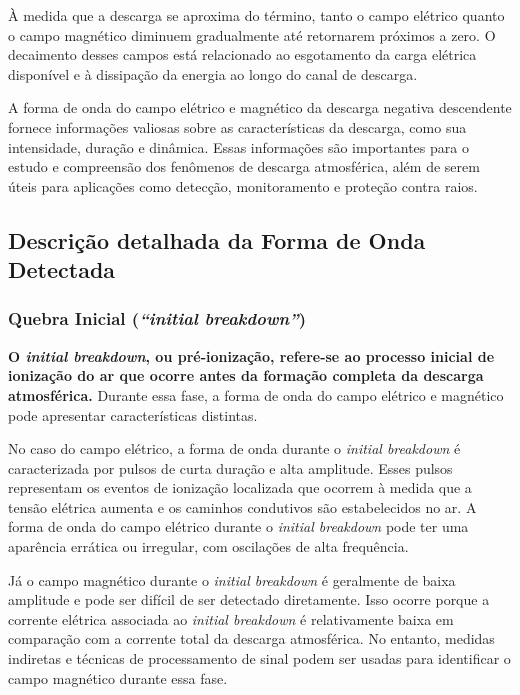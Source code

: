 \documentclass[a4paper, 12pt, onecolumn,singlespacing]{article}
\begin{document}
	À medida que a descarga se aproxima do término, tanto o campo elétrico quanto o campo magnético diminuem gradualmente até retornarem próximos a zero. O decaimento desses campos está relacionado ao esgotamento da carga elétrica disponível e à dissipação da energia ao longo do canal de descarga.
	
	A forma de onda do campo elétrico e magnético da descarga negativa descendente fornece informações valiosas sobre as características da descarga, como sua intensidade, duração e dinâmica. Essas informações são importantes para o estudo e compreensão dos fenômenos de descarga atmosférica, além de serem úteis para aplicações como detecção, monitoramento e proteção contra raios.
	
	\subsection{Descrição detalhada da Forma de Onda Detectada}
	
	\subsubsection{ Quebra Inicial (\textit{``initial breakdown''})}
	
		\textbf{O \textit{initial breakdown}\cite{RAKOV_UHMAN}, ou pré-ionização, refere-se ao processo inicial de ionização do ar que ocorre antes da formação completa da descarga atmosférica.} Durante essa fase, a forma de onda do campo elétrico e magnético pode apresentar características distintas.
		
		No caso do campo elétrico, a forma de onda durante o \textit{initial breakdown} é caracterizada por pulsos de curta duração e alta amplitude. Esses pulsos representam os eventos de ionização localizada que ocorrem à medida que a tensão elétrica aumenta e os caminhos condutivos são estabelecidos no ar. A forma de onda do campo elétrico durante o \textit{initial breakdown} pode ter uma aparência errática ou irregular, com oscilações de alta frequência.
		
		Já o campo magnético durante o \textit{initial breakdown} é geralmente de baixa amplitude e pode ser difícil de ser detectado diretamente. Isso ocorre porque a corrente elétrica associada ao \textit{initial breakdown} é relativamente baixa em comparação com a corrente total da descarga atmosférica. No entanto, medidas indiretas e técnicas de processamento de sinal podem ser usadas para identificar o campo magnético durante essa fase.
		
\end{document}
